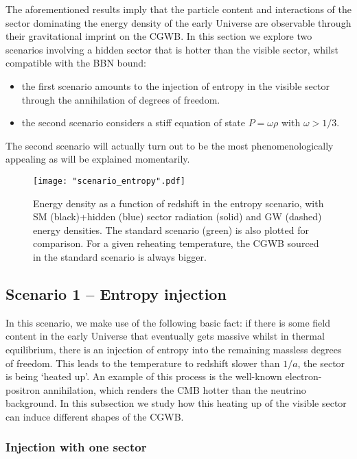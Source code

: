 \documentclass[a4paper,11pt]{article}
\begin{document}
The aforementioned results imply that the particle content and interactions of the sector dominating the energy density of the early Universe are observable through their gravitational imprint on the CGWB.
In this section we explore two scenarios involving a hidden sector that is hotter than the visible sector, whilst compatible with the BBN bound:
\begin{itemize}
\item the first scenario amounts to the injection of entropy in the visible sector through the annihilation of degrees of freedom.
\item the second scenario considers a stiff equation of state $P=\omega \rho$ with $\omega>1/3$.
\end{itemize}
The second scenario will actually turn out to be the most phenomenologically appealing as will be explained momentarily.


\begin{figure}[t!]
\centerline{\texttt{[image: "scenario\_entropy".pdf]}}
\caption{Energy density as a function of redshift in the entropy scenario, with SM (black)+hidden (blue) sector radiation (solid) and GW (dashed) energy densities. The standard scenario (green) is also plotted for comparison. For a given reheating temperature, the CGWB sourced in the standard scenario is always bigger.}
\label{fig:EntropyInjection}
\end{figure}

\subsection{Scenario 1 -- Entropy injection}\label{sec:entropy}

In this scenario, we make use of the following basic fact:
if there is some
field content in the early Universe that eventually gets massive whilst in thermal equilibrium, there is an injection of entropy into the remaining massless degrees of freedom. This leads to the temperature to redshift slower than $1/a$, the sector is being `heated up'. An example of this process is the well-known electron-positron annihilation, which renders the CMB hotter than the neutrino background. In this subsection we study how this heating up of the visible sector can induce different shapes of the CGWB.

\subsubsection*{Injection with one sector}
\end{document}
